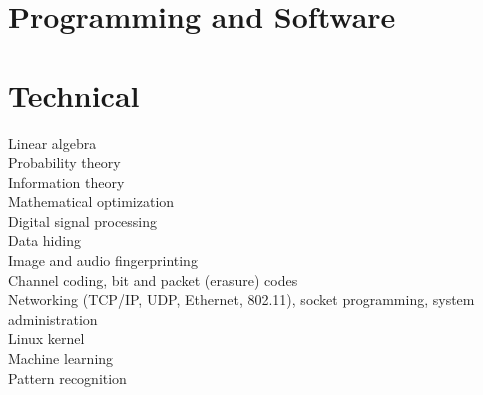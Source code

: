 \section{Programming and Software}



\section{Technical}
\cvitem{}{}
Linear algebra\\
Probability theory\\
Information theory\\
Mathematical optimization\\
Digital signal processing\\
Data hiding\\
Image and audio fingerprinting\\
Channel coding, bit and packet (erasure) codes\\
Networking (TCP/IP, UDP, Ethernet, 802.11), socket programming, system administration\\
Linux kernel \\
Machine learning\\
Pattern recognition\\

